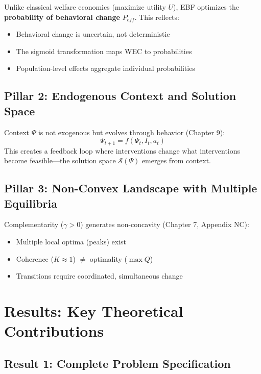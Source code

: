 Unlike classical welfare economics (maximize utility $U$), EBF optimizes the
\textbf{probability of behavioral change} $P_{eff}$. This reflects:
\begin{itemize}
\item Behavioral change is uncertain, not deterministic
\item The sigmoid transformation maps WEC to probabilities
\item Population-level effects aggregate individual probabilities
\end{itemize}

\subsection{Pillar 2: Endogenous Context and Solution Space}

Context $\Psi$ is not exogenous but evolves through behavior (Chapter 9):
\[
\Psi_{t+1} = f(\Psi_t, I_t, a_t)
\]
This creates a feedback loop where interventions change what interventions
become feasible---the solution space $\mathcal{S}(\Psi)$ emerges from context.

\subsection{Pillar 3: Non-Convex Landscape with Multiple Equilibria}

Complementarity ($\gamma > 0$) generates non-concavity (Chapter 7, Appendix NC):
\begin{itemize}
\item Multiple local optima (peaks) exist
\item Coherence ($K \approx 1$) $\neq$ optimality ($\max Q$)
\item Transitions require coordinated, simultaneous change
\end{itemize}

\section{Results: Key Theoretical Contributions}
\label{sec:mp-results}

\subsection{Result 1: Complete Problem Specification}

